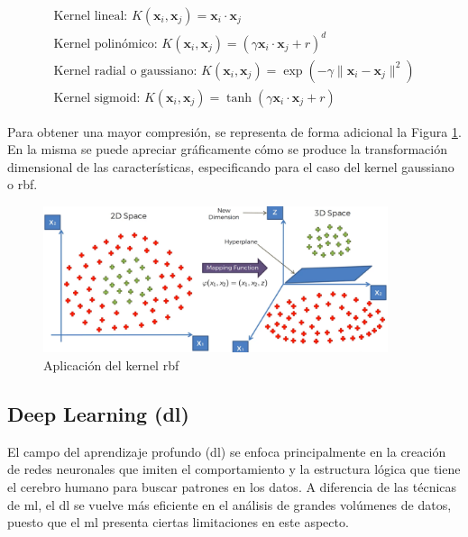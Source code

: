 \begin{equation}
    \begin{aligned}
        \text{Kernel lineal: } K(\mathbf{x}_i, \mathbf{x}_j) = \mathbf{x}_i \cdot \mathbf{x}_j \\
        \text{Kernel polinómico: } K(\mathbf{x}_i, \mathbf{x}_j) = (\gamma \mathbf{x}_i \cdot \mathbf{x}_j + r)^d \\
        \text{Kernel radial o gaussiano: } K(\mathbf{x}_i, \mathbf{x}_j) = \exp \left( -\gamma \| \mathbf{x}_i - \mathbf{x}_j \|^2 \right) \\
        \text{Kernel sigmoid: } K(\mathbf{x}_i, \mathbf{x}_j) = \tanh(\gamma \mathbf{x}_i \cdot \mathbf{x}_j + r)
    \end{aligned}
\end{equation}


\vspace{3mm}

Para obtener una mayor compresión, se representa de forma adicional la Figura \ref{fig:rbf}. En la misma se puede apreciar gráficamente cómo se produce la transformación dimensional de las características, especificando para el caso del kernel gaussiano o \gls{rbf}.

\vspace{3mm}

\begin{figure}[H]
    \centering
    \includegraphics[width=0.9\textwidth]{img/teoria/rbf.png}
    \caption{Aplicación del kernel \acrshort{rbf} \cite{rbf}}
    \label{fig:rbf}
\end{figure}

\subsection{Deep Learning (\acrshort{dl})}
\label{sec:dl}

El campo del aprendizaje profundo (\acrfull{dl}) se enfoca principalmente en la creación de redes neuronales que imiten el comportamiento y la estructura lógica que tiene el cerebro humano para buscar patrones en los datos. A diferencia de las técnicas de \gls{ml}, el \gls{dl} se vuelve más eficiente en el análisis de grandes volúmenes de datos, puesto que el \gls{ml} presenta ciertas limitaciones en este aspecto. \cite{metal} 

